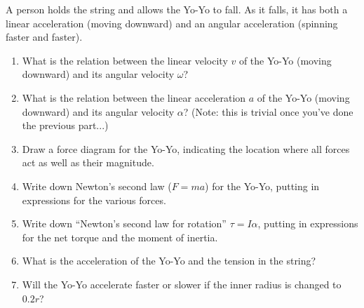 \documentclass[12pt]{article}
\begin{document}
\bigskip
\bigskip


A person holds the string and allows the Yo-Yo to fall. As it falls, it has both a linear acceleration (moving downward) and an angular acceleration (spinning faster and faster).

\begin{enumerate}

 \item{What is the relation between the linear velocity $v$ of the Yo-Yo (moving downward) and its angular velocity $\omega$?}

\vspace{1in}

       \item{What is the relation between the linear acceleration $a$ of the Yo-Yo (moving downward) and its angular velocity $\alpha$? (Note: this is trivial once you've done the previous part...)}

\vspace{1in}

       \item{Draw a force diagram for the Yo-Yo, indicating the location where all forces act as well as their magnitude.}
\vspace{3in}

       \item{Write down Newton's second law ($F=ma$) for the Yo-Yo, putting in expressions for the various forces.}

\vspace{2in}

       \item{Write down ``Newton's second law for rotation'' $\tau = I \alpha$, putting in expressions for the net torque and the moment of inertia.}

\vspace{2in}

       \item{What is the acceleration of the Yo-Yo and the tension in the string?}

\vspace{3in}

       \item{Will the Yo-Yo accelerate faster or slower if the inner radius is changed to $0.2r$?}

     \end{enumerate}
\end{document}
